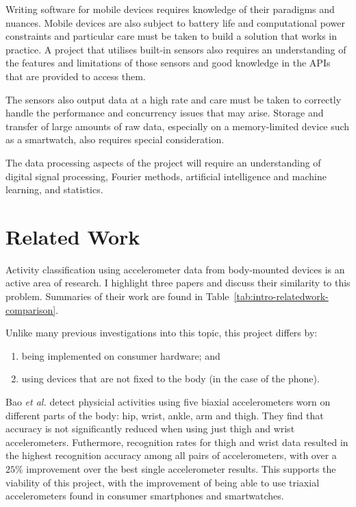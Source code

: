     Writing software for mobile devices requires knowledge of their paradigms and nuances.
    Mobile devices are also subject to battery life and computational power constraints and   
    particular care must be taken to build a solution that works in practice.  
    A project that utilises built-in sensors also requires an understanding of the features and 
    limitations of those sensors and good knowledge in the APIs that are provided to access them.

    The sensors also output data at a high rate and care must be taken to correctly handle the
    performance and concurrency issues that may arise. Storage and transfer of large amounts of
    raw data, especially on a memory-limited device such as a smartwatch, also requires special
    consideration. 
    
    The data processing aspects of the project will require an understanding of digital signal 
    processing, Fourier methods, artificial intelligence and machine learning, and statistics.

  \section{Related Work}
  \label{sec:intro-relatedwork}
    Activity classification using accelerometer data from body-mounted devices is an active area of
    research. I highlight three papers and discuss their similarity to this problem. Summaries of
    their work are found in Table~\ref{tab:intro-relatedwork-comparison}.
    
    Unlike many previous investigations into this topic, this project differs by:
      \begin{enumerate}
        \item being implemented on consumer hardware; and
        \item using devices that are not fixed to the body (in the case of the phone).
      \end{enumerate}

    Bao \emph{et al.} \cite{bao2004activity} detect physicial activities using five biaxial accelerometers
    worn on different parts of the body: hip, wrist, ankle, arm and thigh. They find that accuracy  
    is not significantly reduced when using just thigh and wrist accelerometers. Futhermore,
    recognition rates for thigh and wrist data resulted in the highest recognition accuracy among
    all pairs of accelerometers, with over a $25\%$ improvement over the best single accelerometer
    results. This supports the viability of this project, with the improvement of being able to use 
    triaxial accelerometers found in consumer smartphones and smartwatches.
    
